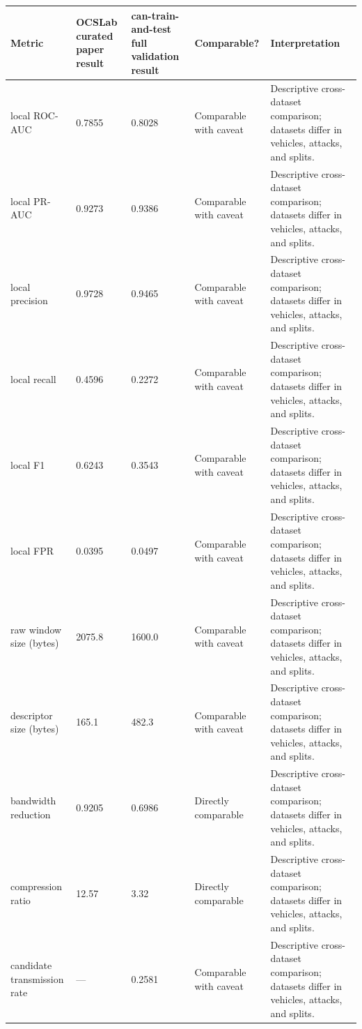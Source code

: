 \begin{tabular}{lllll}
\toprule
Metric & OCSLab curated paper result & can-train-and-test full validation result & Comparable? & Interpretation \\
\midrule
local ROC-AUC & 0.7855 & 0.8028 & Comparable with caveat & Descriptive cross-dataset comparison; datasets differ in vehicles, attacks, and splits. \\
local PR-AUC & 0.9273 & 0.9386 & Comparable with caveat & Descriptive cross-dataset comparison; datasets differ in vehicles, attacks, and splits. \\
local precision & 0.9728 & 0.9465 & Comparable with caveat & Descriptive cross-dataset comparison; datasets differ in vehicles, attacks, and splits. \\
local recall & 0.4596 & 0.2272 & Comparable with caveat & Descriptive cross-dataset comparison; datasets differ in vehicles, attacks, and splits. \\
local F1 & 0.6243 & 0.3543 & Comparable with caveat & Descriptive cross-dataset comparison; datasets differ in vehicles, attacks, and splits. \\
local FPR & 0.0395 & 0.0497 & Comparable with caveat & Descriptive cross-dataset comparison; datasets differ in vehicles, attacks, and splits. \\
raw window size (bytes) & 2075.8 & 1600.0 & Comparable with caveat & Descriptive cross-dataset comparison; datasets differ in vehicles, attacks, and splits. \\
descriptor size (bytes) & 165.1 & 482.3 & Comparable with caveat & Descriptive cross-dataset comparison; datasets differ in vehicles, attacks, and splits. \\
bandwidth reduction & 0.9205 & 0.6986 & Directly comparable & Descriptive cross-dataset comparison; datasets differ in vehicles, attacks, and splits. \\
compression ratio & 12.57 & 3.32 & Directly comparable & Descriptive cross-dataset comparison; datasets differ in vehicles, attacks, and splits. \\
candidate transmission rate & — & 0.2581 & Comparable with caveat & Descriptive cross-dataset comparison; datasets differ in vehicles, attacks, and splits. \\
\bottomrule
\end{tabular}
